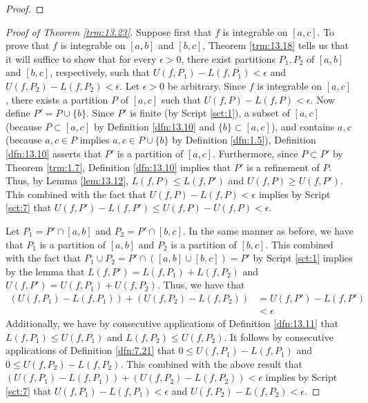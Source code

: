 \documentclass[../main.tex]{subfiles}
\begin{document}
\begin{theorem}
\begin{lemma*}
\begin{proof}
        \end{proof}
    \end{lemma*}
    \begin{proof}[Proof of Theorem \ref{trm:13.23}]
        Suppose first that $f$ is integrable on $[a,c]$. To prove that $f$ is integrable on $[a,b]$ and $[b,c]$, Theorem \ref{trm:13.18} tells us that it will suffice to show that for every $\epsilon>0$, there exist partitions $P_1,P_2$ of $[a,b]$ and $[b,c]$, respectively, such that $U(f,P_1)-L(f,P_1)<\epsilon$ and $U(f,P_2)-L(f,P_2)<\epsilon$. Let $\epsilon>0$ be arbitrary. Since $f$ is integrable on $[a,c]$, there exists a partition $P$ of $[a,c]$ such that $U(f,P)-L(f,P)<\epsilon$. Now define $P'=P\cup\{b\}$. Since $P'$ is finite (by Script \ref{sct:1}), a subset of $[a,c]$ (because $P\subset[a,c]$ by Definition \ref{dfn:13.10} and $\{b\}\subset[a,c]$), and contains $a,c$ (because $a,c\in P$ implies $a,c\in P\cup\{b\}$ by Definition \ref{dfn:1.5}), Definition \ref{dfn:13.10} asserts that $P'$ is a partition of $[a,c]$. Furthermore, since $P\subset P'$ by Theorem \ref{trm:1.7}, Definition \ref{dfn:13.10} implies that $P'$ is a refinement of $P$. Thus, by Lemma \ref{lem:13.12}, $L(f,P)\leq L(f,P')$ and $U(f,P)\geq U(f,P')$. This combined with the fact that $U(f,P)-L(f,P)<\epsilon$ implies by Script \ref{sct:7} that $U(f,P')-L(f,P')\leq U(f,P)-U(f,P)<\epsilon$.\par
        Let $P_1=P'\cap[a,b]$ and $P_2=P'\cap[b,c]$. In the same manner as before, we have that $P_1$ is a partition of $[a,b]$ and $P_2$ is a partition of $[b,c]$. This combined with the fact that $P_1\cup P_2=P'\cap([a,b]\cup[b,c])=P'$ by Script \ref{sct:1} implies by the lemma that $L(f,P')=L(f,P_1)+L(f,P_2)$ and $U(f,P')=U(f,P_1)+U(f,P_2)$. Thus, we have that
        \begin{align*}
            (U(f,P_1)-L(f,P_1))+(U(f,P_2)-L(f,P_2)) &= U(f,P')-L(f,P')\\
            &< \epsilon
        \end{align*}
        Additionally, we have by consecutive applications of Definition \ref{dfn:13.11} that $L(f,P_1)\leq U(f,P_1)$ and $L(f,P_2)\leq U(f,P_2)$. It follows by consecutive applications of Definition \ref{dfn:7.21} that $0\leq U(f,P_1)-L(f,P_1)$ and $0\leq U(f,P_2)-L(f,P_2)$. This combined with the above result that $(U(f,P_1)-L(f,P_1))+(U(f,P_2)-L(f,P_2))<\epsilon$ implies by Script \ref{sct:7} that $U(f,P_1)-L(f,P_1)<\epsilon$ and $U(f,P_2)-L(f,P_2)<\epsilon$.\par\smallskip

\end{proof}
\end{theorem}
\end{document}

